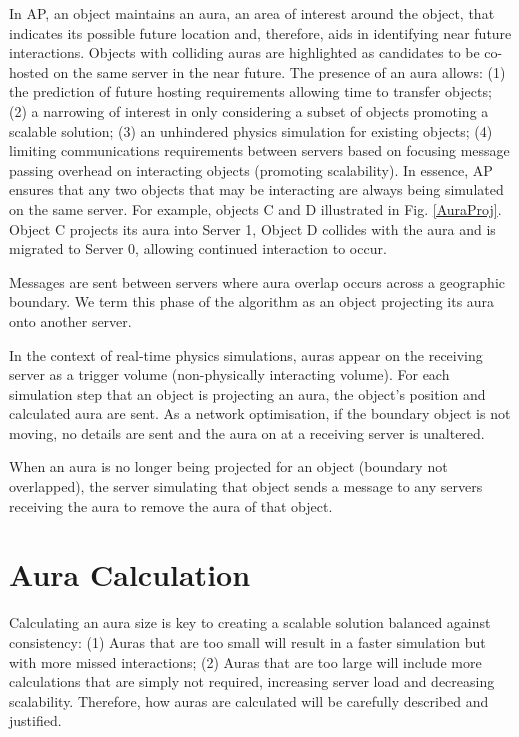 In AP, an object maintains an aura, an area of interest around the object, that indicates its possible future location and, therefore, aids in identifying near future interactions. Objects with colliding auras are highlighted as candidates to be co-hosted on the same server in the near future. The presence of an aura allows: (1) the prediction of future hosting requirements allowing time to transfer objects; (2) a narrowing of interest in only considering a subset of objects promoting a scalable solution; (3) an unhindered physics simulation for existing objects; (4) limiting communications requirements between servers based on focusing message passing overhead on interacting objects (promoting scalability). In essence, AP ensures that any two objects that may be interacting are always being simulated on the same server. For example, objects C and D illustrated in Fig. \ref{AuraProj}. Object C projects its aura into Server 1, Object D collides with the aura and is migrated to Server 0, allowing continued interaction to occur.

Messages are sent between servers where aura overlap occurs across a geographic boundary. We term this phase of the algorithm as an object projecting its aura onto another server. %

In the context of real-time physics simulations, auras appear on the receiving server as a trigger volume (non-physically interacting volume). For each simulation step that an object is projecting an aura, the object's position and calculated aura are sent. As a network optimisation, if the boundary object is not moving, no details are sent and the aura on at a receiving server is unaltered.

When an aura is no longer being projected for an object (boundary not overlapped), the server simulating that object sends a message to any servers receiving the aura to remove the aura of that object.

\section{Aura Calculation}
Calculating an aura size is key to creating a scalable solution balanced against consistency: (1) Auras that are too small will result in a faster simulation but with more missed interactions; (2) Auras that are too large will include more calculations that are simply not required, increasing server load and decreasing scalability. Therefore, how auras are calculated will be carefully described and justified. 

